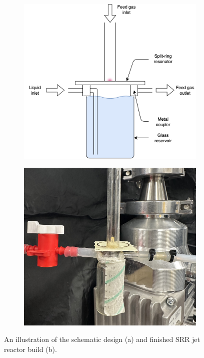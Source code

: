 \begin{figure}
    \centering
    \begin{subfigure}[b]{0.475\textwidth}
        \centering
        \includegraphics[width=\textwidth]{chapter_6/figures/SRR_jet_reactor_schematic.png}
        \caption{}
        \label{fig:SRR_jet_reactor_schematic}
    \end{subfigure}
    \hfill
    \begin{subfigure}[b]{0.475\textwidth}  
        \centering 
        \includegraphics[width=\textwidth]{chapter_6/figures/SRR_jet_reactor_schematic.jpeg}
        \caption{}
        \label{fig:SRR_jet_reactor_picture}
    \end{subfigure}

    \caption{\small An illustration of the schematic design (a) and finished SRR jet  reactor build (b).} 
    \label{fig:SSR_jet_reactor_illustration}
\end{figure}

